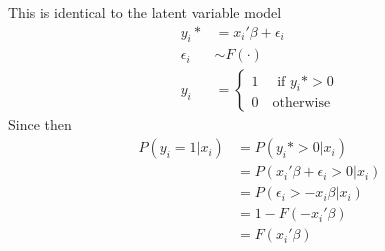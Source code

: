 \documentclass[DIV=14,titlepage=false]{scrreprt}
\begin{document}
This is identical to the latent variable model
\begin{align*}
    y_i*&=x_i'\beta+\epsilon_i\\
    \epsilon_i &\sim F(\cdot)\\
    y_i &= \begin{cases}
        1 \quad \text{ if } y_i*>0\\
        0 \quad \text{otherwise}
    \end{cases}
\end{align*}
Since then
\begin{align*}
    P(y_i=1|x_i)&=P(y_i*>0|x_i)\\
    &= P(x_i'\beta+\epsilon_i>0|x_i)\\
    &= P(\epsilon_i>-x_i\beta |x_i)\\
    &= 1-F(-x_i'\beta)\\
    &= F(x_i'\beta)
\end{align*}
\end{document}
